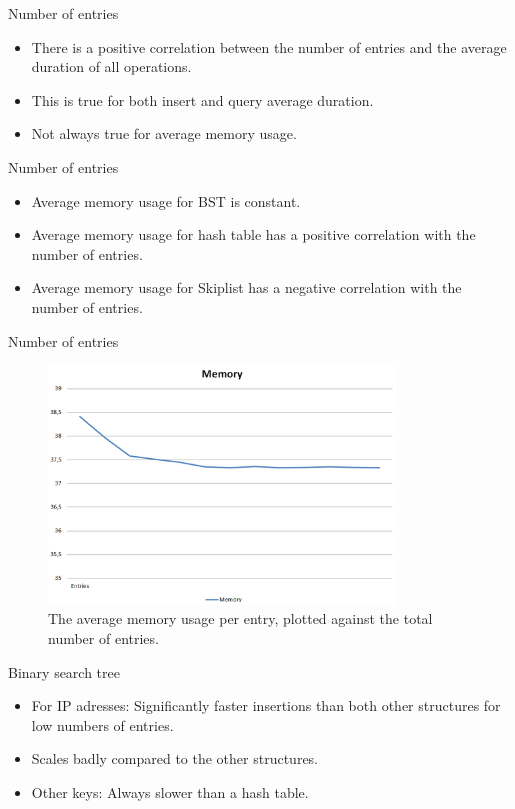 \documentclass[10pt]{beamer}
\begin{document}
\begin{frame}{Number of entries}
    \begin{itemize}
        \item There is a positive correlation between the number of entries and the average duration of all operations.
        \item This is true for both insert and query average duration.
        \item Not always true for average memory usage.
    \end{itemize}
\end{frame}

\begin{frame}{Number of entries}
    \begin{itemize}
        \item Average memory usage for BST is constant.
        \item Average memory usage for hash table has a positive correlation with the number of entries.
        \item Average memory usage for Skiplist has a negative correlation with the number of entries.
    \end{itemize}
\end{frame}

\begin{frame}{Number of entries}
    \begin{figure}
      \centering
        \includegraphics[width=0.82\textwidth]{SkiplistMemory}
      \caption{The average memory usage per entry, plotted against the total number of entries.}
    \end{figure}
\end{frame}

\begin{frame}{Binary search tree}
    \begin{itemize}
        \item For IP adresses: Significantly faster insertions than both other structures for low numbers of entries.
        \item Scales badly compared to the other structures.
        \item Other keys: Always slower than a hash table.
    \end{itemize}
\end{frame}
\end{document}
